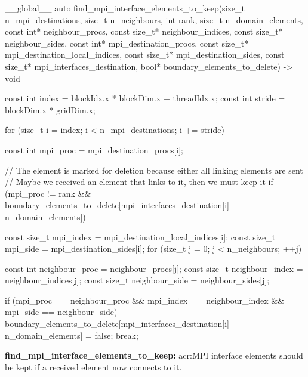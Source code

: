 \begin{algorithm}[H]
    \begin{cuda}
        __global__
        auto find_mpi_interface_elements_to_keep(size_t n_mpi_destinations, 
                size_t n_neighbours, int rank, size_t n_domain_elements, 
                const int* neighbour_procs, const size_t* neighbour_indices, 
                const size_t* neighbour_sides, const int* mpi_destination_procs, 
                const size_t* mpi_destination_local_indices, 
                const size_t* mpi_destination_sides, 
                const size_t* mpi_interfaces_destination, 
                bool* boundary_elements_to_delete) -> void {

            const int index = blockIdx.x * blockDim.x + threadIdx.x;
            const int stride = blockDim.x * gridDim.x;

            for (size_t i = index; i < n_mpi_destinations; i += stride) {
                const int mpi_proc = mpi_destination_procs[i];

                // The element is marked for deletion because either all linking elements are sent
                // Maybe we received an element that links to it, then we must keep it
                if  (mpi_proc != rank 
                  && boundary_elements_to_delete[mpi_interfaces_destination[i]-n_domain_elements]) {
                    const size_t mpi_index = mpi_destination_local_indices[i];
                    const size_t mpi_side = mpi_destination_sides[i];
                    for (size_t j = 0; j < n_neighbours; ++j) {
                        const int neighbour_proc = neighbour_procs[j];
                        const size_t neighbour_index = neighbour_indices[j];
                        const size_t neighbour_side = neighbour_sides[j];

                        if  (mpi_proc  == neighbour_proc 
                          && mpi_index == neighbour_index 
                          && mpi_side  == neighbour_side) {
                            boundary_elements_to_delete[mpi_interfaces_destination[i] 
                                                      - n_domain_elements] = false; 
                            break;
                        }
                    }
                }
            }
        }\end{cuda}
\caption{\textbf{find\_mpi\_interface\_elements\_to\_keep:} \Acrshort{acr:MPI} interface elements should be kept if a received element now connects to it.}\label{alg:find_mpi_interface_elements_to_keep}
\end{algorithm}

